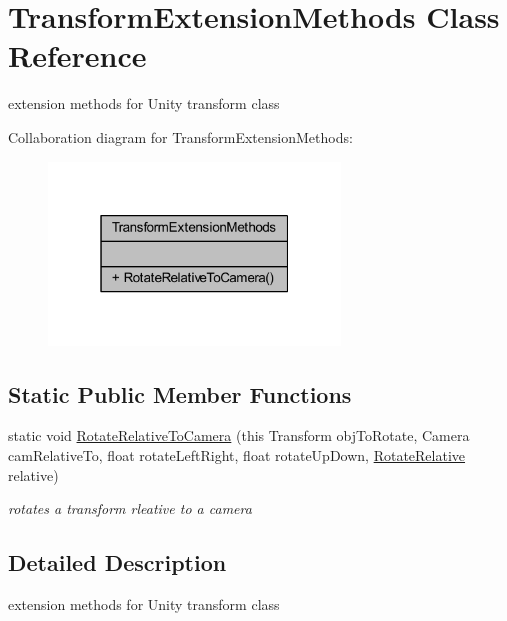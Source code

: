 \hypertarget{class_transform_extension_methods}{}\section{Transform\+Extension\+Methods Class Reference}
\label{class_transform_extension_methods}


extension methods for Unity transform class  




Collaboration diagram for Transform\+Extension\+Methods\+:
\nopagebreak
\begin{figure}[H]
\begin{center}
\leavevmode
\includegraphics[width=220pt]{class_transform_extension_methods__coll__graph}
\end{center}
\end{figure}
\subsection*{Static Public Member Functions}
\begin{DoxyCompactItemize}
\item 
static void \mbox{\hyperlink{class_transform_extension_methods_ad6c9459ef6c2fd963fb1145f11c839a3}{Rotate\+Relative\+To\+Camera}} (this Transform obj\+To\+Rotate, Camera cam\+Relative\+To, float rotate\+Left\+Right, float rotate\+Up\+Down, \mbox{\hyperlink{_transform_extension_methods_8cs_a6652dfee9c8aeffcd5b5858801e16ca4}{Rotate\+Relative}} relative)
\begin{DoxyCompactList}\small\item\em rotates a transform rleative to a camera \end{DoxyCompactList}\end{DoxyCompactItemize}


\subsection{Detailed Description}
extension methods for Unity transform class 



